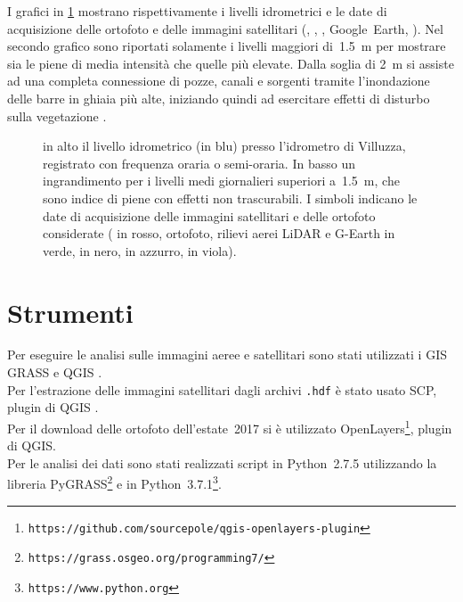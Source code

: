 I grafici in \cref{graph:livelli-orto-sat} mostrano rispettivamente i livelli idrometrici e le date di acquisizione delle ortofoto e delle immagini satellitari (\AST{}, \Pl{}, \Se{}, Google~Earth, \WV{}). 
Nel secondo grafico sono riportati solamente i livelli maggiori di~\SI{1.5}{\m} per mostrare sia le piene di media intensità che quelle più elevate.
Dalla soglia di \SI{2}{\m} si assiste ad una completa connessione di pozze, canali e sorgenti tramite l'inondazione delle barre in ghiaia più alte, iniziando quindi ad esercitare effetti di disturbo sulla vegetazione .
%
\begin{figure}
	\centering
	
	
	\caption[livelli idrometrici e date di acquisizione delle foto aeree e delle immagini satellitari]{in alto il livello idrometrico (in blu) presso l'idrometro di Villuzza, registrato con frequenza oraria o semi-oraria. 
	In basso un ingrandimento per i livelli medi giornalieri superiori a~\SI{1.5}{\m}, che sono indice di piene con effetti non trascurabili.
	I simboli indicano le date di acquisizione delle immagini satellitari e delle ortofoto considerate (\AST{} in rosso, ortofoto, rilievi aerei LiDAR e G-Earth in verde, \Pl{} in nero, \Se{} in azzurro, \WV{} in viola).}
	\label{graph:livelli-orto-sat}
\end{figure}



\section{Strumenti}
Per eseguire le analisi sulle immagini aeree e satellitari sono stati utilizzati i GIS GRASS  e QGIS . 
\\
Per l'estrazione delle immagini satellitari \AST{} dagli archivi \texttt{.hdf} è stato usato SCP, plugin di QGIS . 
\\
Per il download delle ortofoto dell'estate~2017 si è utilizzato
OpenLayers\footnote{\texttt{https://github.com/sourcepole/qgis-openlayers-plugin}}, plugin di QGIS.
\\
Per le analisi dei dati sono stati realizzati script in Python~2.7.5 utilizzando la libreria PyGRASS\footnote{\texttt{https://grass.osgeo.org/programming7/}}  e in Python~3.7.1\footnote{\texttt{https://www.python.org}}.

